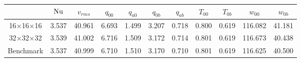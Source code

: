 \begin{tabular}{c|cccccccccc}
    & $\mathrm{Nu}$ & $v_{rms}$ & $q_{00}$ & $q_{a0}$ &  $q_{0b}$ &$q_{ab}$ & $T_{00}$ & $T_{0b}$ & $w_{00}$ & $w_{0b}$ \\
\hline
16$\times$16$\times$16 & 3.537 & 40.961 & 6.693 & 1.499 & 3.207 & 0.718 &0.800 & 0.619 &116.082 & 41.181 \\
32$\times$32$\times$32 & 3.539 & 41.002 & 6.716 & 1.509 & 3.172 & 0.714 &0.801 & 0.619 &116.673 & 40.438 \\
\hline
Benchmark & 3.537 & 40.999 & 6.710 & 1.510 & 3.170 & 0.710 &0.801 & 0.619 &116.625 & 40.500 \\
\end{tabular}
